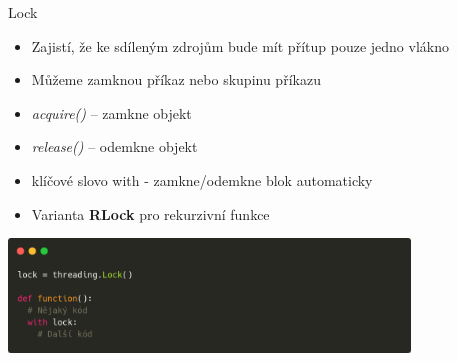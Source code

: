 \documentclass{beamer}
\begin{document}
\begin{frame}[fragile]{Lock}
    \begin{itemize}
            \item Zajistí, že ke sdíleným zdrojům bude mít přítup pouze jedno vlákno
            \item Můžeme zamknou příkaz nebo skupinu příkazu

            \vskip 0.15in
            \item \textit{acquire()} – zamkne objekt
            \item \textit{release()} – odemkne objekt
            \item klíčové slovo with - zamkne/odemkne blok automaticky

            \vskip 0.15in
            \item Varianta \textbf{RLock} pro rekurzivní funkce
    \end{itemize}
    \scriptsize

    \begin{center}
        \includegraphics[width=0.8\textwidth]{obrazky/codes/carbon2.png}
    \end{center}
\end{frame}
\end{document}
